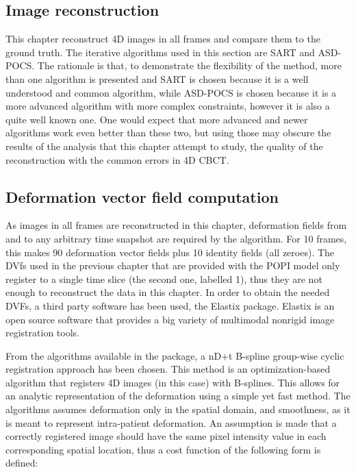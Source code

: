 \subsection{Image reconstruction}

This chapter reconstruct 4D images in all frames and compare them to the ground truth. The iterative algorithms used in this section are SART and ASD-POCS. The rationale is that, to demonstrate the flexibility of the method, more than one algorithm is presented and SART is chosen because it is a well understood and common algorithm, while ASD-POCS is chosen because it is a more advanced algorithm with more complex constraints, however it is also a quite well known one. One would expect that more advanced and newer algorithms  work even better than these two, but using those may obscure the results of the analysis that this chapter attempt to study, the quality of the reconstruction with the common errors in 4D CBCT.

\subsection{Deformation vector field computation}

As images in all frames are reconstructed in this chapter, deformation fields from and to any arbitrary time snapshot are required by the algorithm. For 10 frames, this makes 90 deformation vector fields plus 10 identity fields (all zeroes). The DVfs used in the previous chapter that are provided with the POPI model only register to a single time slice (the second one, labelled 1), thus they are not enough to reconstruct the data in this chapter. In order to obtain the needed DVFs, a third party software has been used, the Elastix\cite{elastix} package. Elastix is an open source software that provides a big variety of multimodal nonrigid image registration tools. 

From the algorithms available in the package, a nD+t B-spline group-wise cyclic registration\cite{metz2011nonrigid} approach has been chosen. This method is an optimization-based algorithm that registers 4D images (in this case) with B-splines. This allows for an analytic representation of the deformation using a simple yet fast method. The algorithms assumes deformation only in the spatial domain, and smoothness, as it is meant to represent intra-patient deformation. An assumption is made that a correctly registered image should have the same pixel intensity value in each corresponding spatial location, thus a cost function of the following form is defined:

